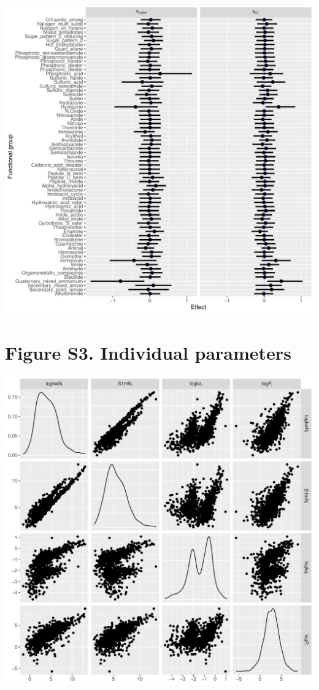 \documentclass[
]{article}
\begin{document}
\includegraphics{../deliv/figures/manuscript/supplement/parameter-estimates-fg2.pdf}

\newpage{}

\hypertarget{figure-s3.-individual-parameters}{%
\section{Figure S3. Individual
parameters}\label{figure-s3.-individual-parameters}}

\includegraphics{../deliv/figures/manuscript/supplement/iparam.pdf}
\end{document}
